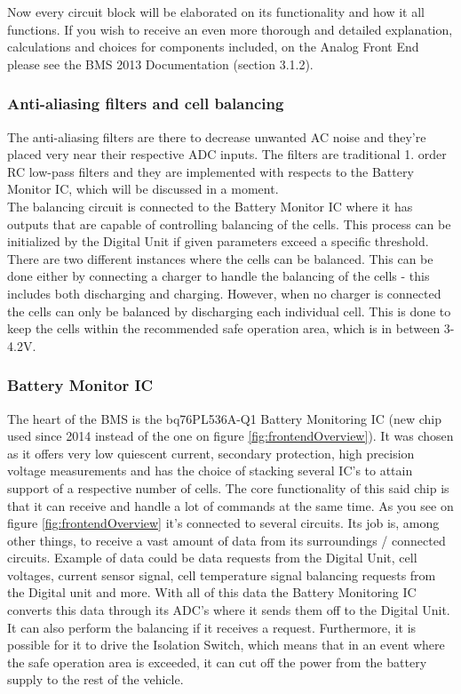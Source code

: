 Now every circuit block will be elaborated on its functionality and how it all functions. If you wish to receive an even more thorough and detailed explanation, calculations and choices for components included, on the Analog Front End please see the BMS 2013 Documentation \cite{BMSDocumentation} (section 3.1.2).

\subsubsection{Anti-aliasing filters and cell balancing}
The anti-aliasing filters are there to decrease unwanted AC noise and they're placed very near their respective ADC inputs. The filters are traditional 1. order RC low-pass filters and they are implemented with respects to the Battery Monitor IC, which will be discussed in a moment.\\
The balancing circuit is connected to the Battery Monitor IC where it has outputs that are capable of controlling balancing of the cells. This process can be initialized by the Digital Unit if given parameters exceed a specific threshold.\\
There are two different instances where the cells can be balanced. This can be done either by connecting a charger to handle the balancing of the cells - this includes both discharging and charging. However, when no charger is connected the cells can only be balanced by discharging each individual cell. This is done to keep the cells within the recommended safe operation area, which is in between 3-4.2V.

\subsubsection{Battery Monitor IC}
The heart of the BMS is the bq76PL536A-Q1 Battery Monitoring IC (new chip used since 2014 instead of the one on figure \vref{fig:frontendOverview}). It was chosen as it offers very low quiescent current, secondary protection, high precision voltage measurements and has the choice of stacking several IC's to attain support of a respective number of cells. The core functionality of this said chip is that it can receive and handle a lot of commands at the same time. As you see on figure \vref{fig:frontendOverview} it's connected to several circuits. Its job is, among other things, to receive a vast amount of data from its surroundings / connected circuits. Example of data could be data requests from the Digital Unit, cell voltages, current sensor signal, cell temperature signal balancing requests from the Digital unit and more. With all of this data the Battery Monitoring IC converts this data through its ADC's where it sends them off to the Digital Unit. It can also perform the balancing if it receives a request. Furthermore, it is possible for it to drive the Isolation Switch, which means that in an event where the safe operation area is exceeded, it can cut off the power from the battery supply to the rest of the vehicle.

